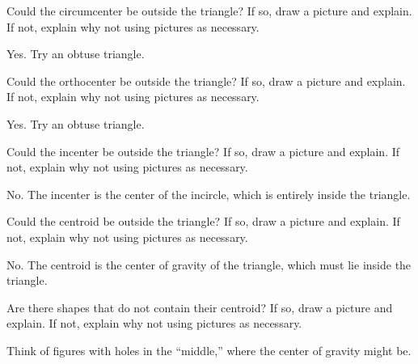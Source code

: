\documentclass[nooutcomes]{ximera}
\begin{document}
\begin{problem}
Could the circumcenter be outside the triangle? If so, draw a
  picture and explain. If not, explain why not using pictures as
  necessary.
\begin{freeResponse}
\begin{hint}
Yes.  Try an obtuse triangle. 
\end{hint}
\end{freeResponse}
\end{problem}

\begin{problem}
Could the orthocenter be outside the triangle? If so, draw a
  picture and explain. If not, explain why not using pictures as
  necessary.
\begin{freeResponse}
\begin{hint}
Yes.  Try an obtuse triangle. 
\end{hint}
\end{freeResponse}
\end{problem}

\begin{problem}
Could the incenter be outside the triangle? If so, draw a
  picture and explain. If not, explain why not using pictures as
  necessary.
\begin{freeResponse}
\begin{hint}
No.  The incenter is the center of the incircle, which is entirely inside the triangle.  
\end{hint}
\end{freeResponse}
\end{problem}

\begin{problem}
Could the centroid be outside the triangle? If so, draw a
  picture and explain. If not, explain why not using pictures as
  necessary.
\begin{freeResponse}
\begin{hint}
No. The centroid is the center of gravity of the triangle, which must lie inside the triangle.  
\end{hint}
\end{freeResponse}
\end{problem}

\begin{problem}
Are there shapes that do not contain their centroid? If so, draw
  a picture and explain. If not, explain why not using pictures as
  necessary.
\begin{freeResponse}
\begin{hint}
Think of figures with holes in the ``middle,'' where the center of gravity might be.  
\end{hint}
\end{freeResponse}
\end{problem}
\end{document}

